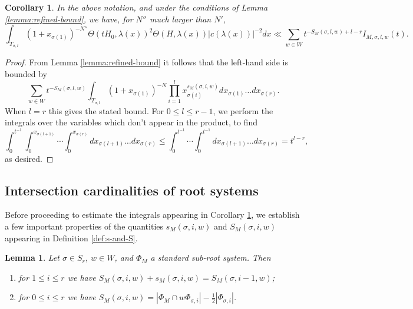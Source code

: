 \documentclass[12pt]{amsart}
\newtheorem{lemma}[theorem]{Lemma}
\newtheorem{cor}[theorem]{Corollary}
\theoremstyle{remark}
\begin{document}
\begin{cor}\label{cor:red-to-I-integral}
In the above notation, and under the conditions of Lemma \ref{lemma:refined-bound}, we have, for $N''$ much larger than $N'$,
\[
\int_{ T_{\sigma, l} } (1 + x_{\sigma(1)})^{-N''} \Theta(tH_0, \lambda(x))^2 \Theta( H, \lambda(x)) |c(\lambda(x))|^{-2} dx\ll \sum_{w\in W} t^{ -S_M(\sigma,l,w) +l - r}I_{M,\sigma, l,w}(t).
\]
\end{cor}
\begin{proof}
From Lemma \ref{lemma:refined-bound} it follows that the left-hand side is bounded by
\[
\sum_{w \in W} t^{ -S_M(\sigma, l,w) }\int_{ T_{\sigma, l} } (1 + x_{\sigma(1)})^{-N} \prod_{i = 1}^{l} x_{\sigma(i)}^{s_M(\sigma,i,w) } dx_{\sigma(1)} \ldots dx_{\sigma(r)}.
\]
When $l=r$ this gives the stated bound. For $0\le l\le r-1$, we perform the integrals over the variables which don't appear in the product, to find 
\[
\int_0^{t^{-1}}\int_0^{x_{\sigma(l+1)}}  \cdots \int_0^{x_{\sigma(r)}}  dx_{\sigma(l+1)} \ldots dx_{\sigma(r)}\le \int_0^{t^{-1}}\cdots  \int_0^{t^{-1}} dx_{\sigma(l+1)} \ldots dx_{\sigma(r)}=t^{l-r},
\]
as desired.
\end{proof}

\subsection{Intersection cardinalities of root systems}


Before proceeding to estimate the integrals appearing in Corollary \ref{cor:red-to-I-integral}, we establish a few important properties of the quantities $s_M(\sigma,i,w)$ and $S_M(\sigma,i,w)$ appearing in Definition \ref{def:s-and-S}.
\begin{lemma}\label{lemma:S-properties}
Let $\sigma\in S_r$, $w\in W$, and $\Phi_M$ a standard sub-root system. Then
\begin{enumerate}
\item\label{S-recursive} for $1\le i\le r$ we have $S_M(\sigma,i,w) + s_M(\sigma,i,w) = S_M(\sigma,i-1,w)$;
\item\label{S-relation} for $0\le i\le r$ we have $S_M(\sigma,i,w)=|\Phi_M\cap w\Phi_{\sigma,i}|-\frac12 |\Phi_{\sigma,i}|$.
\end{enumerate}
\end{lemma}
\end{document}
